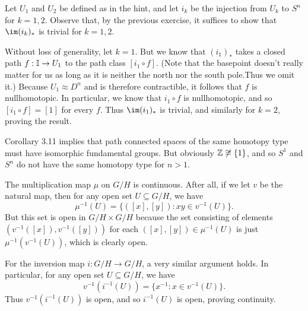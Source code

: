\documentclass[../../solutions.tex]{subfiles}
\begin{document}
\begin{exercise} \leavevmode
Let $U_1$ and $U_2$ be defined as in the hint, and let $i_k$ be the injection from $U_k$ to $S^n$ for $k=1,2$. 
Observe that, by the previous exercise, it suffices to show that $\im(i_k)_*$ is trivial for $k=1,2$. 

Without loss of generality, let $k=1$. 
But we know that $(i_1)_*$ takes a closed path $f:\mathbb I\to U_1$ to the path class $[i_1\circ f]$. 
(Note that the basepoint doesn't really matter for us as long as it is neither the north nor the south pole.Thus we omit it.)
Because $U_1\approx D^n$ and is therefore contractible, it follows that $f$ is nullhomotopic. 
In particular, we know that $i_1\circ f$ is nullhomotopic, and so $[i_1\circ f]=[1]$ for every $f$. 
Thus $\im(i_1)_*$ is trivial, and similarly for $k=2$, proving the result. 
\end{exercise}

\begin{exercise} \leavevmode
Corollary 3.11 implies that path connected spaces of the same homotopy type must have isomorphic fundamental groups. 
But obviously $\mathbb{Z}\not\cong\{1\}$, and so $S^1$ and $S^n$ do not have the same homotopy type for $n>1$. 
\end{exercise}

\begin{exercise} \leavevmode
The multiplication map $\mu$ on $G/H$ is continuous. 
After all, if we let $v$ be the natural map, then for any open set $U\subseteq G/H$, we have \[\mu^{-1}(U)=\{([x],[y]):xy\in v^{-1}(U)\}.\] 
But this set is open in $G/H\times G/H$ because the set consisting of elements $(v^{-1}([x]),v^{-1}([y]))$ for each $([x],[y])\in \mu^{-1}(U)$ is just $\mu^{-1}(v^{-1}(U))$, which is clearly open. 

For the inversion map $i:G/H\to G/H$, a very similar argument holds. 
In particular, for any open set $U\subseteq G/H$, we have \[v^{-1}(i^{-1}(U))=\{x^{-1}:x\in v^{-1}(U)\}.\]
Thus $v^{-1}(i^{-1}(U))$ is open, and so $i^{-1}(U)$ is open, proving continuity. 
\end{exercise}
\end{document}
